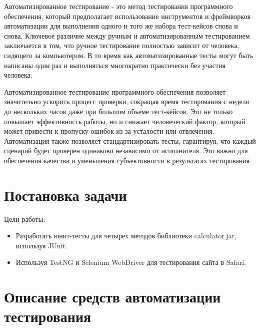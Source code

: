 \documentclass[areasetadvanced]{scrartcl}
\begin{document}
	Автоматизированное тестирование - это метод тестирования программного обеспечения, который предполагает использование инструментов и фреймворков автоматизации для выполнения одного и того же набора тест-кейсов снова и снова. Ключевое различие между ручным и автоматизированным тестированием заключается в том, что ручное тестирование полностью зависит от человека, сидящего за компьютером. В то время как автоматизированные тесты могут быть написаны один раз и выполняться многократно практически без участия человека.

	Автоматизированное тестирование программного обеспечения позволяет значительно ускорить процесс проверки, сокращая время тестирования с недели до нескольких часов даже при большом объеме тест-кейсов. Это не только повышает эффективность работы, но и снижает человеческий фактор, который может привести к пропуску ошибок из-за усталости или отвлечения.
	Автоматизация также позволяет стандартизировать тесты, гарантируя, что каждый сценарий будет проверен одинаково независимо от исполнителя.
	Это важно для обеспечения качества и уменьшения субъективности в результатах тестирования.
	\newpage
	\section{Постановка задачи}
	Цели работы:
	\begin{itemize}
		\item Разработать юнит-тесты для четырех методов библиотеки calculator.jar, используя JUnit.
		\item Используя TestNG и Selenium WebDriver для тестирования сайта в Safari.
\end{itemize}
\newpage
\section{Описание средств автоматизации тестирования}
\end{document}
